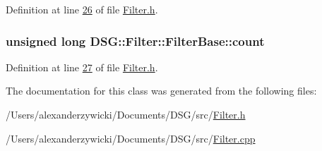 Definition at line \hyperlink{_filter_8h_source_l00026}{26} of file \hyperlink{_filter_8h_source}{Filter.\+h}.

\hypertarget{class_d_s_g_1_1_filter_1_1_filter_base_a74068413169f9acb3fcf8276074e3b1d}{
\subsubsection[{count}]{\setlength{\rightskip}{0pt plus 5cm}unsigned long D\+S\+G\+::\+Filter\+::\+Filter\+Base\+::count\hspace{0.3cm}{\ttfamily [protected]}}}\label{class_d_s_g_1_1_filter_1_1_filter_base_a74068413169f9acb3fcf8276074e3b1d}


Definition at line \hyperlink{_filter_8h_source_l00027}{27} of file \hyperlink{_filter_8h_source}{Filter.\+h}.



The documentation for this class was generated from the following files\+:\begin{DoxyCompactItemize}
\item 
/\+Users/alexanderzywicki/\+Documents/\+D\+S\+G/src/\hyperlink{_filter_8h}{Filter.\+h}\item 
/\+Users/alexanderzywicki/\+Documents/\+D\+S\+G/src/\hyperlink{_filter_8cpp}{Filter.\+cpp}\end{DoxyCompactItemize}
